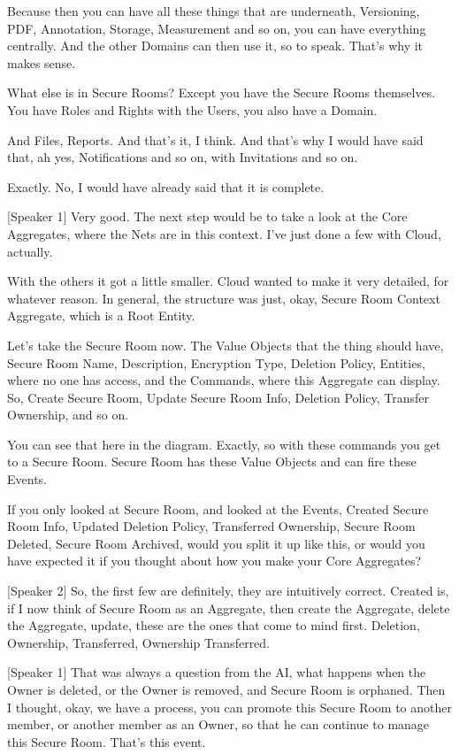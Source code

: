 Because then you can have all these things that are underneath, Versioning, PDF, Annotation, Storage, Measurement and so on, you can have everything centrally. And the other Domains can then use it, so to speak. That's why it makes sense.

What else is in Secure Rooms? Except you have the Secure Rooms themselves. You have Roles and Rights with the Users, you also have a Domain.

And Files, Reports. And that's it, I think. And that's why I would have said that, ah yes, Notifications and so on, with Invitations and so on.

Exactly. No, I would have already said that it is complete.

[Speaker 1]
Very good. The next step would be to take a look at the Core Aggregates, where the Nets are in this context. I've just done a few with Cloud, actually.

With the others it got a little smaller. Cloud wanted to make it very detailed, for whatever reason. In general, the structure was just, okay, Secure Room Context Aggregate, which is a Root Entity.

Let's take the Secure Room now. The Value Objects that the thing should have, Secure Room Name, Description, Encryption Type, Deletion Policy, Entities, where no one has access, and the Commands, where this Aggregate can display. So, Create Secure Room, Update Secure Room Info, Deletion Policy, Transfer Ownership, and so on.

You can see that here in the diagram. Exactly, so with these commands you get to a Secure Room. Secure Room has these Value Objects and can fire these Events.

If you only looked at Secure Room, and looked at the Events, Created Secure Room Info, Updated Deletion Policy, Transferred Ownership, Secure Room Deleted, Secure Room Archived, would you split it up like this, or would you have expected it if you thought about how you make your Core Aggregates?

[Speaker 2]
So, the first few are definitely, they are intuitively correct. Created is, if I now think of Secure Room as an Aggregate, then create the Aggregate, delete the Aggregate, update, these are the ones that come to mind first. Deletion, Ownership, Transferred, Ownership Transferred.

[Speaker 1]
That was always a question from the AI, what happens when the Owner is deleted, or the Owner is removed, and Secure Room is orphaned. Then I thought, okay, we have a process, you can promote this Secure Room to another member, or another member as an Owner, so that he can continue to manage this Secure Room. That's this event.

